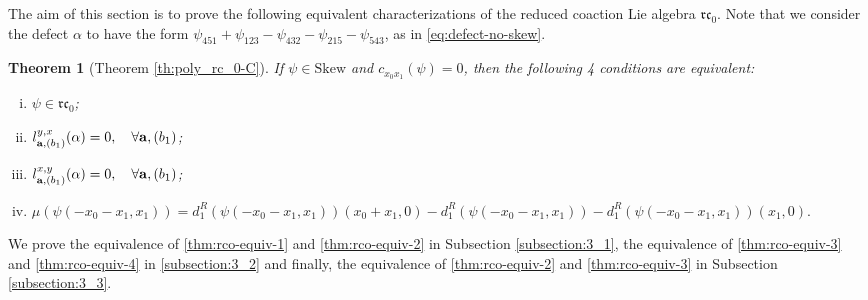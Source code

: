 \documentclass[a4paper,fleqn]{cas-sc}
\newtheorem{theorem}{Theorem}
\newcommand{\rc}{\mathfrak{rc}}
\begin{document}

The aim of this section is to prove the following equivalent characterizations of the reduced coaction Lie algebra $\rc_0$. Note that we consider the defect $\alpha$ to have the form 
    $\psi_{451} + \psi_{123} - \psi_{432} - \psi_{215} - \psi_{543}$,
as in \eqref{eq:defect-no-skew}.


\begin{theorem}[Theorem \ref{th:poly_rc_0-C}]
\label{th:poly_rc_0}
If $\psi\in \mathrm{Skew}$ and $c_{x_0x_1}(\psi)=0$, then the following 4 conditions are equivalent:

    \begin{enumerate}[(i)]
        \item \label{thm:rco-equiv-1}
        $\psi\in \mathfrak{rc}_0$;
        \item \label{thm:rco-equiv-2}
        $l^{y,x}_{{\bf{a}},(b_1)}(\alpha)=0, \quad \forall {\bf{a}},(b_1)$;
        \item \label{thm:rco-equiv-3}
        $l_{{\bf{a}},(b_1)}^{x,y}(\alpha)=0, \quad  \forall {\bf{a}},(b_1)$;
        \item \label{thm:rco-equiv-4}
        $\mu(\psi(-x_0-x_1,x_1))=  d^R_1(\psi(-x_0-x_1,x_1))(x_0+x_1,0) - d ^R_{1}(\psi(-x_0-x_1,x_1))-d^R_1(\psi(-x_0-x_1,x_1))(x_1,0).$  
    \end{enumerate}
\end{theorem}

We prove the equivalence of \eqref{thm:rco-equiv-1} and \eqref{thm:rco-equiv-2} in Subsection \ref{subsection:3_1}, the equivalence of \eqref{thm:rco-equiv-3} and \eqref{thm:rco-equiv-4} in \ref{subsection:3_2} and finally, the equivalence of \eqref{thm:rco-equiv-2} and \eqref{thm:rco-equiv-3} in Subsection \ref{subsection:3_3}.
\end{document}
